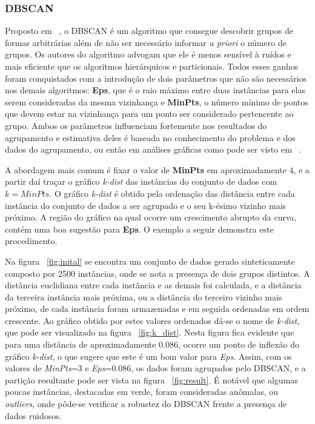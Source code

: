 \subsubsection{DBSCAN} \label{sec:dbscan}

Proposto em ~\parencite{DBSCAN}, o DBSCAN é um algoritmo que consegue descobrir grupos de formas arbitrárias além de não ser necessário informar \emph{a priori} o número de grupos. Os autores do algoritmo advogam que ele é menos sensível à ruídos e mais eficiente que os algoritmos hierárquicos e particionais. Todos esses ganhos foram conquistados com a introdução de dois parâmetros que não são necessários nos demais algoritmos: \textbf{Eps}, que é o raio máximo entre duas instâncias para elas serem consideradas da mesma vizinhança e \textbf{MinPts}, o número mínimo de pontos que devem estar na vizinhança para um ponto ser considerado pertencente ao grupo. Ambos os parâmetros influenciam fortemente nos resultados do agrupamento e estimativa deles é baseada no conhecimento do problema e dos dados do agrupamento, ou então em análises gráficas como pode ser visto em ~\parencite{DBSCAN}.

A abordagem mais comum é fixar o valor de \textbf{MinPts} em aproximadamente $4$, e a partir daí traçar o gráfico \emph{k-dist} das instâncias do conjunto de dados com $k=MinPts$. O gráfico \emph{k-dist} é obtido pela ordenação das distância entre cada instância do conjunto de dados a ser agrupado e o seu k-ésimo vizinho mais próximo. A região do gráfico na qual ocorre um crescimento abrupto da curva, contém uma boa sugestão para \textbf{Eps}. O exemplo a seguir demonstra este procedimento.

Na figura ~\ref{fig:inital} se encontra um conjunto de dados gerado sinteticamente composto por 2500 instâncias, onde se nota a presença de dois grupos distintos. A distância euclidiana entre cada instância e as demais foi calculada, e a distância da terceira instância mais próxima, ou a distância do terceiro vizinho mais próximo, de cada instância foram armazenadas e em seguida ordenadas em ordem crescente. Ao gráfico obtido por estes valores ordenados dá-se o nome de \emph{k-dist}, que pode ser visualizado na figura ~\ref{fig:k_dist}. Nesta figura fica evidente que para uma distância de aproximadamente $0.086$, ocorre um ponto de inflexão do gráfico \emph{k-dist}, o que sugere que este é um bom valor para \emph{Eps}. Assim, com os valores de \emph{MinPts}=$3$ e \emph{Eps}=$0.086$, os dados foram agrupados pelo DBSCAN, e a partição resultante pode ser vista na figura ~\ref{fig:result}. É notável que algumas poucas instâncias, destacadas em verde, foram consideradas anômalas, ou \emph{outliers}, onde pôde-se verificar a robustez do DBSCAN frente a presença de dados ruidosos.

